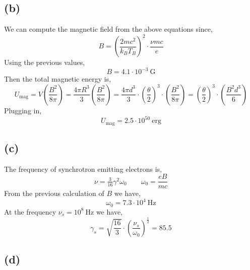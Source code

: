 \documentclass[12pt]{article}
\begin{document}
\subsection*{(b)}

We can compute the magnetic field from the above equations since,
\[ B = \left( \frac{2 m c^2}{k_B T_B} \right)^2 \cdot \frac{\nu m c}{e} \]
Using the previous values,
\[ B = 4.1 \cdot 10^{-3} \: \mathrm{G} \]
Then the total magnetic energy is,
\[ U_{\text{mag}} = V \left( \frac{B^2}{8 \pi} \right) = \frac{4 \pi R^3}{3} \left( \frac{B^2}{8 \pi} \right) = \frac{4 \pi d^3}{3} \cdot \left( \frac{\theta}{2} \right)^3 \cdot \left( \frac{B^2}{8 \pi} \right) = \left( \frac{\theta}{2} \right)^3 \cdot \left( \frac{B^2 d^3}{6} \right) \]
Plugging in,
\[ U_{\text{mag}} = 2.5 \cdot 10^{50} \: \mathrm{erg}  \]

\subsection*{(c)}

The frequency of synchrotron emitting electrons is,
\[ \nu = \tfrac{3}{16} \gamma^2 \omega_0 \quad \quad \omega_0 = \frac{e B}{m c} \]
From the previous calculation of $B$ we have,
\[ \omega_0 = 7.3 \cdot 10^{4} \: \mathrm{Hz} \] 
At the frequency $\nu_s = 10^{8} \: \mathrm{Hz}$ we have,
\[ \gamma_s = \sqrt{\frac{16}{3}} \cdot \left( \frac{\nu_s}{\omega_0} \right)^{\frac{1}{2}} = 85.5 \]

\subsection*{(d)}
\end{document}
